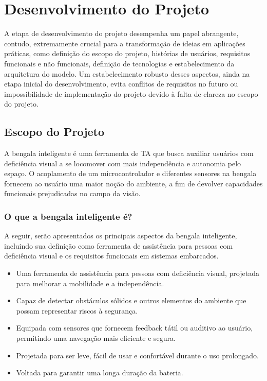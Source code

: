 \chapter{Desenvolvimento do Projeto}
\label{chap:resultados}

    A etapa de desenvolvimento do projeto desempenha um papel abrangente, contudo, extremamente crucial para a transformação de ideias em aplicações práticas, como definição do escopo do projeto, histórias de usuários, requisitos funcionais e não funcionais, definição de tecnologias e estabelecimento da arquitetura do modelo. Um estabelecimento robusto desses aspectos, ainda na etapa inicial do desenvolvimento, evita conflitos de requisitos no futuro ou impossibilidade de implementação do projeto devido à falta de clareza no escopo do projeto.   

\section{Escopo do Projeto}
\label{sec:resultados-do-experimento-a}

    A bengala inteligente é uma ferramenta de TA que busca auxiliar usuários com deficiência visual a se locomover com mais independência e autonomia pelo espaço. O acoplamento de um microcontrolador e diferentes sensores na bengala fornecem ao usuário uma maior noção do ambiente, a fim de devolver capacidades funcionais prejudicadas no campo da visão.

    \subsection{O que a bengala inteligente é?}
    A seguir, serão apresentados os principais aspectos da bengala inteligente, incluindo sua definição como ferramenta de assistência para pessoas com deficiência visual e os requisitos funcionais em sistemas embarcados.
        \begin{itemize} 
            \item Uma ferramenta de assistência para pessoas com deficiência visual, projetada para melhorar a mobilidade e a independência.
            
            \item Capaz de detectar obstáculos sólidos e outros elementos do ambiente que possam representar riscos à segurança.
            
            \item Equipada com sensores que fornecem feedback tátil ou auditivo ao usuário, permitindo uma navegação mais eficiente e segura.
            
            \item Projetada para ser leve, fácil de usar e confortável durante o uso prolongado.
            
            \item Voltada para garantir uma longa duração da bateria.
        \end{itemize}

